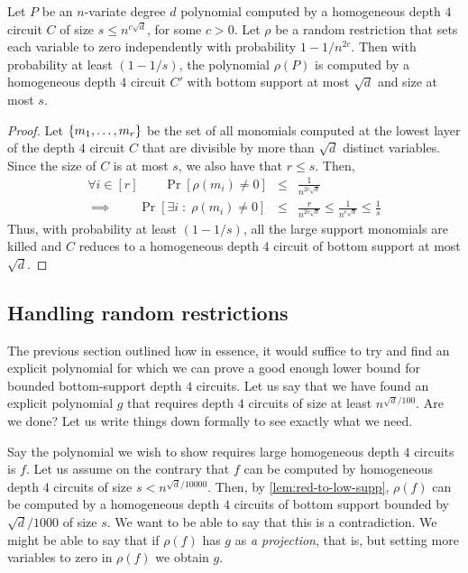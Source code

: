 \begin{lemma}\label{lem:red-to-low-supp}
Let $P$ be an $n$-variate degree $d$ polynomial computed by a homogeneous depth $4$ circuit $C$ of size $s \leq n^{c\sqrt{d}}$, for some $c>0$. 
Let $\rho$ be a random restriction that sets each variable to zero independently with probability $1 - 1/n^{2c}$. 
Then with probability at least $(1 - 1/s)$, the polynomial $\rho(P)$ is computed by a homogeneous depth $4$ circuit $C'$ with bottom support at most $\sqrt{d}$ and size at most $s$. 
\end{lemma}
\begin{proof}
Let $\left\{m_1,\dots, m_r\right\}$ be the set of all monomials computed at the lowest layer of the depth $4$ circuit $C$ that are divisible by more than $\sqrt{d}$ distinct variables. 
Since the size of $C$ is at most $s$, we also have that $r\leq s$. 
Then,
\begin{eqnarray*}
\forall i\in [r] \qquad \Pr[\rho(m_i) \neq 0] & \leq & \frac{1}{n^{2c\sqrt{d}}}\\
\implies \qquad \Pr[\exists i \;:\; \rho(m_i) \neq 0] & \leq & \frac{r}{n^{2c\sqrt{d}}} \leq \frac{1}{n^{c\sqrt{d}}} \leq \frac{1}{s}
\end{eqnarray*}
Thus, with probability at least $(1 - 1/s)$, all the large support monomials are killed and $C$ reduces to a homogeneous depth $4$ circuit of bottom support at most $\sqrt{d}$. 
\end{proof}

\subsection{Handling random restrictions}

The previous section outlined how in essence, it would suffice to try and find an explicit polynomial for which we can prove a good enough lower bound for bounded bottom-support depth $4$ circuits. 
Let us say that we have found an explicit polynomial $g$ that requires depth $4$ circuits of size at least $n^{\sqrt{d}/100}$. 
Are we done? Let us write things down formally to see exactly what we need. 

Say the polynomial we wish to show requires large homogeneous depth $4$ circuits is $f$. 
Let us assume on the contrary that $f$ can be computed by homogeneous depth $4$ circuits of size $s < n^{\sqrt{d}/10000}$. 
Then, by \autoref{lem:red-to-low-supp}, $\rho(f)$ can be computed by a homogeneous depth $4$ circuits of bottom support bounded by $\sqrt{d}/1000$ of size $s$. 
We want to be able to say that this is a contradiction. 
We might be able to say that if $\rho(f)$ has $g$ as \emph{a projection}, that is, but setting more variables to zero in $\rho(f)$ we obtain $g$. 

